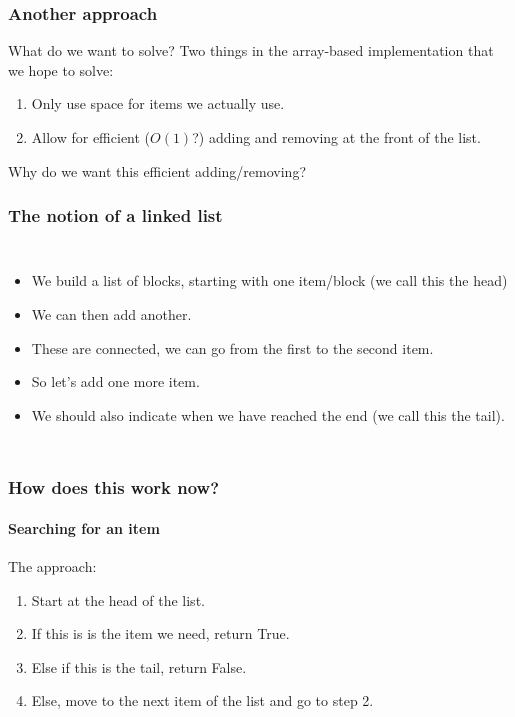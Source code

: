 \begin{frame}
	\frametitle{Another approach}
	
	\begin{block}{What do we want to solve?}
		Two things in the array-based implementation that we hope to solve:
		\begin{enumerate}
			\item Only use space for items we actually use.
			\item Allow for efficient ($O(1)$?) adding and removing at the front of the list.
		\end{enumerate}
	\end{block}
	\pause
	\begin{block}{}
		Why do we want this efficient adding/removing?
	\end{block}
\end{frame}

\begin{frame}
	\frametitle{The notion of a linked list}
	\begin{columns}
			\begin{itemize}
				\item We build a list of blocks, starting with one item/block (we call this the \alert{head})
				\item<2-> We can then add another.
				\item<3-> These are connected, we can go from the first to the second item.
				\item<4-> So let's add one more item.
				\item<5-> We should also indicate when we have reached the end (we call this the \alert{tail}).
			\end{itemize}
	\end{columns}
\end{frame}

\begin{frame}
	\frametitle{How does this work now?}
	\framesubtitle{Searching for an item}	
	The approach:
	\begin{enumerate}
		\item Start at the head of the list.
		\item<2-> If this is is the item we need, return True.
		\item<2-> Else if this is the tail, return False.
		\item<3-> Else, move to the next item of the list and go to step 2.
	\end{enumerate}

	
\end{frame}

